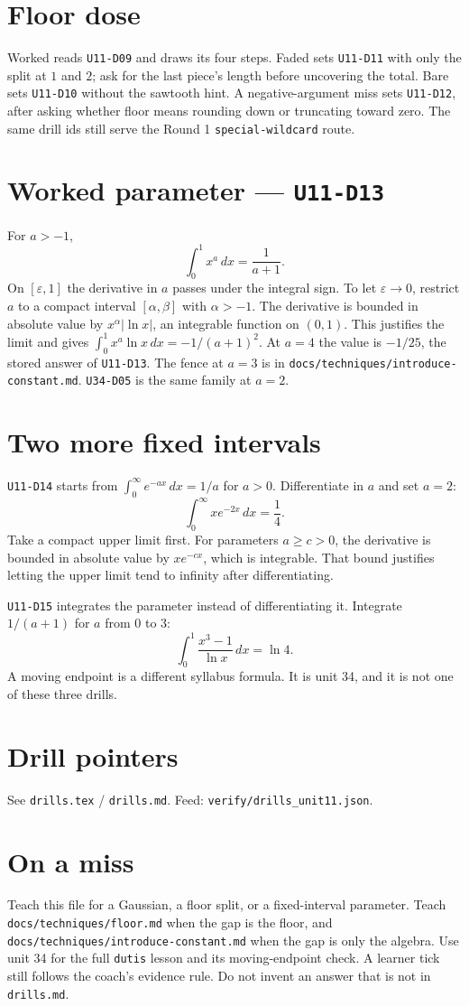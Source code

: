 \section{Floor dose}
Worked reads \texttt{U11-D09} and draws its four steps. Faded sets \texttt{U11-D11} with only the split at $1$ and $2$; ask for the last piece's length before uncovering the total. Bare sets \texttt{U11-D10} without the sawtooth hint. A negative-argument miss sets \texttt{U11-D12}, after asking whether floor means rounding down or truncating toward zero. The same drill ids still serve the Round 1 \texttt{special-wildcard} route.

\section{Worked parameter --- \texttt{U11-D13}}
For $a>-1$,
\[
\int_0^1 x^a\,dx=\frac{1}{a+1}.
\]
On $[\varepsilon,1]$ the derivative in $a$ passes under the integral sign. To let $\varepsilon\to 0$, restrict $a$ to a compact interval $[\alpha,\beta]$ with $\alpha>-1$. The derivative is bounded in absolute value by $x^\alpha|\ln x|$, an integrable function on $(0,1)$. This justifies the limit and gives $\int_0^1x^a\ln x\,dx=-1/(a+1)^2$. At $a=4$ the value is $-1/25$, the stored answer of \texttt{U11-D13}. The fence at $a=3$ is in \texttt{docs/techniques/introduce-constant.md}. \texttt{U34-D05} is the same family at $a=2$.

\section{Two more fixed intervals}
\texttt{U11-D14} starts from $\int_0^{\infty}e^{-ax}\,dx=1/a$ for $a>0$. Differentiate in $a$ and set $a=2$:
\[
\int_0^{\infty}x e^{-2x}\,dx=\frac14.
\]
Take a compact upper limit first. For parameters $a\ge c>0$, the derivative is bounded in absolute value by $xe^{-cx}$, which is integrable. That bound justifies letting the upper limit tend to infinity after differentiating.

\texttt{U11-D15} integrates the parameter instead of differentiating it. Integrate $1/(a+1)$ for $a$ from 0 to 3:
\[
\int_0^1\frac{x^3-1}{\ln x}\,dx=\ln 4.
\]
A moving endpoint is a different syllabus formula. It is unit 34, and it is not one of these three drills.

\section{Drill pointers}
See \texttt{drills.tex} / \texttt{drills.md}. Feed: \texttt{verify/drills\_unit11.json}.

\section*{On a miss}
Teach this file for a Gaussian, a floor split, or a fixed-interval parameter. Teach \texttt{docs/techniques/floor.md} when the gap is the floor, and \texttt{docs/techniques/introduce-constant.md} when the gap is only the algebra. Use unit 34 for the full \texttt{dutis} lesson and its moving-endpoint check. A learner tick still follows the coach's evidence rule. Do not invent an answer that is not in \texttt{drills.md}.


